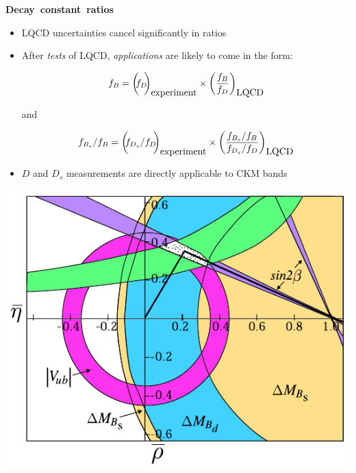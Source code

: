 \documentclass[landscape]{article}
\newenvironment{slide}[1][ ]{\mbox{\bf \boldmath #1 } \vfill}{\vfill \vspace{-1.5 cm} \mbox{ } \pagebreak}
\newenvironment{itemizer}[1]{\begin{itemize}\setlength{\itemsep}{#1}}{\end{itemize}}
\newcommand{\mathhie}{{\color{white} \frac{!}{!} \mbox{\hspace{-0.3 cm}}}}
\begin{document}
\begin{slide}[Decay constant ratios]

\begin{itemizer}{0.5 cm}

  \item LQCD uncertainties cancel significantly in ratios

  \item After {\it tests} of LQCD, {\it applications} are likely to come in the form:

\[ f_B = \left(\mathhie f_D \mathhie\right)_{\mbox{experiment}} \times \left(\frac{f_B}{f_D}\right)_{\mbox{LQCD}} \]

and

\[ f_{B_s}/f_B = \left(\mathhie f_{D_s}/f_D \mathhie\right)_{\mbox{experiment}} \times \left(\frac{f_{B_s}/f_B}{f_{D_s}/f_D}\right)_{\mbox{LQCD}} \]

\end{itemizer}

\begin{minipage}{0.48\linewidth}
  \begin{itemize}
  \item $D$ and $D_s$ measurements are \mbox{directly} applicable to CKM bands
  \end{itemize}
\end{minipage} \hfill \begin{minipage}{0.4\linewidth}
  \includegraphics[width=\linewidth]{../ckm04}
\end{minipage}

\end{slide}
\end{document}
